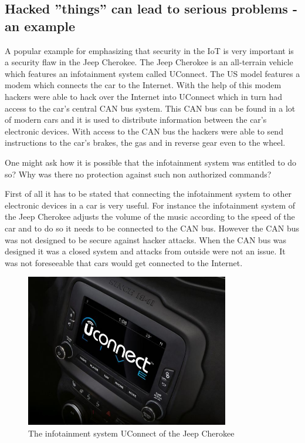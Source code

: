 \documentclass[conference]{IEEEtran}
\begin{document}
\subsection{Hacked ''things'' can lead to serious problems - an example}
A popular example for emphasizing that security in the IoT is very important is 
a security flaw in the Jeep Cherokee. The Jeep Cherokee is an all-terrain 
vehicle which features an infotainment system called UConnect. The US model 
features a modem which connects the car to the Internet. With the help of this 
modem hackers were able to hack over the Internet into UConnect which in turn 
had access to the car's central CAN bus system. This CAN bus can be found in a 
lot of modern cars and it is used to distribute information between the car's 
electronic devices. With access to the CAN bus the hackers were able to send 
instructions to the car's brakes, the gas and in reverse gear even to the 
wheel. \cite{ctArticle}

One might ask how it is possible that the infotainment system was entitled to 
do so? Why was there no protection against such non authorized commands?

First of all it has to be stated that connecting the infotainment system to 
other electronic devices in a car is very useful. For instance the 
infotainment system of the Jeep Cherokee adjusts the volume of the music 
according to the speed of the car and to do so it needs to be connected to the 
CAN bus. However the CAN bus was not designed to be secure against hacker 
attacks. When the CAN bus was designed it was a closed system and attacks from 
outside were not an issue. It was not foreseeable that cars would get connected 
to the Internet.

\begin{figure}[!t]
\centering
\includegraphics[width=3.5in]{./img/uconnectCherokee1.jpg}
\caption{The infotainment system UConnect of the Jeep Cherokee}
\label{uconnect}
\end{figure}
\end{document}
